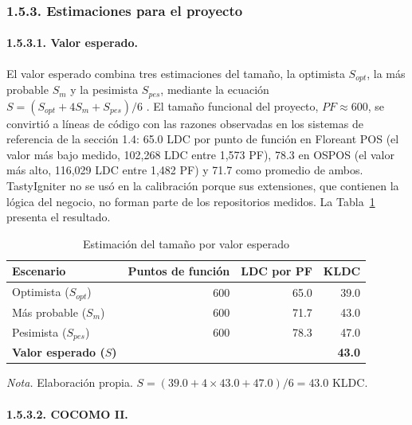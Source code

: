\subsubsection{1.5.3. Estimaciones para el proyecto}

\paragraph{1.5.3.1. Valor esperado.}

El valor esperado combina tres estimaciones del tamaño, la optimista $S_{opt}$, la más probable $S_m$ y la pesimista $S_{pes}$, mediante la ecuación $S = (S_{opt} + 4 S_m + S_{pes}) / 6$ \parencite{pressman2010ingenieria}. El tamaño funcional del proyecto, $PF \approx 600$, se convirtió a líneas de código con las razones observadas en los sistemas de referencia de la sección 1.4: 65.0 LDC por punto de función en Floreant POS (el valor más bajo medido, 102,268 LDC entre 1,573 PF), 78.3 en OSPOS (el valor más alto, 116,029 LDC entre 1,482 PF) y 71.7 como promedio de ambos. TastyIgniter no se usó en la calibración porque sus extensiones, que contienen la lógica del negocio, no forman parte de los repositorios medidos. La Tabla~\ref{tab:valor_esperado} presenta el resultado.

\begin{table}[H]
\caption{Estimación del tamaño por valor esperado}
\label{tab:valor_esperado}
\begin{threeparttable}
\begin{tabular}{>{\raggedright\arraybackslash}p{4.4cm} r r r}
\toprule
Escenario & Puntos de función & LDC por PF & KLDC \\
\midrule
Optimista ($S_{opt}$) & 600 & 65.0 & 39.0 \\
Más probable ($S_m$) & 600 & 71.7 & 43.0 \\
Pesimista ($S_{pes}$) & 600 & 78.3 & 47.0 \\
\midrule
\textbf{Valor esperado ($S$)} & & & \textbf{43.0} \\
\bottomrule
\end{tabular}
\begin{tablenotes}
\item \textit{Nota.} Elaboración propia. $S = (39.0 + 4 \times 43.0 + 47.0) / 6 = 43.0$ KLDC.
\end{tablenotes}
\end{threeparttable}
\end{table}

\paragraph{1.5.3.2. COCOMO II.}

